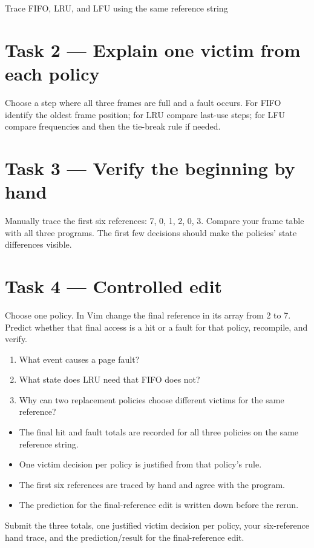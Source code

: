 \begin{labproject}{Trace FIFO, LRU, and LFU using the same reference string}
\section*{Task 2 --- Explain one victim from each policy}
Choose a step where all three frames are full and a fault occurs. For FIFO identify the oldest frame position; for LRU compare last-use steps; for LFU compare frequencies and then the tie-break rule if needed.

\section*{Task 3 --- Verify the beginning by hand}
Manually trace the first six references: 7, 0, 1, 2, 0, 3. Compare your frame table with all three programs. The first few decisions should make the policies' state differences visible.

\section*{Task 4 --- Controlled edit}
Choose one policy. In Vim change the final reference in its array from 2 to 7. Predict whether that final access is a hit or a fault for that policy, recompile, and verify.

\begin{quickcheck}
\begin{enumerate}
  \item What event causes a page fault?
  \item What state does LRU need that FIFO does not?
  \item Why can two replacement policies choose different victims for the same reference?
\end{enumerate}
\end{quickcheck}

\begin{verification}
\begin{itemize}
  \item The final hit and fault totals are recorded for all three policies on the same reference string.
  \item One victim decision per policy is justified from that policy's rule.
  \item The first six references are traced by hand and agree with the program.
  \item The prediction for the final-reference edit is written down before the rerun.
\end{itemize}
\end{verification}

\begin{labdeliverable}
Submit the three totals, one justified victim decision per policy, your six-reference hand trace, and the prediction/result for the final-reference edit.
\end{labdeliverable}
\end{labproject}
